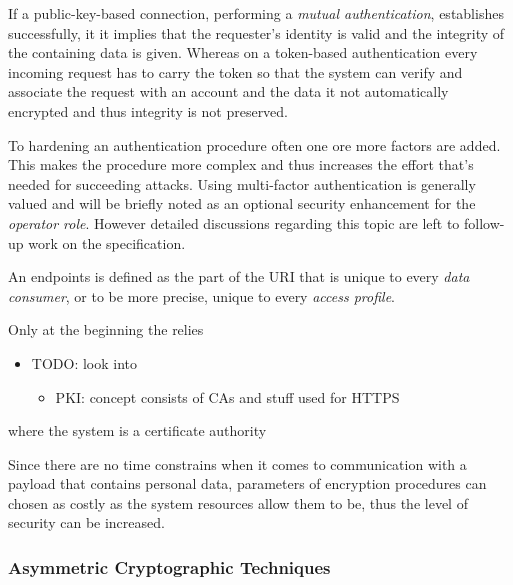 \documentclass[12pt,english,a4paper,titlepage,cleardoublepage=empty,dottedtoc]{report}
\providecommand{\tightlist}{%
  \setlength{\itemsep}{0pt}\setlength{\parskip}{0pt}}
\begin{document}
If a public-key-based connection, performing a \emph{mutual
authentication}, establishes successfully, it it implies that the
requester's identity is valid and the integrity of the containing data
is given. Whereas on a token-based authentication every incoming request
has to carry the token so that the system can verify and associate the
request with an account and the data it not automatically encrypted and
thus integrity is not preserved.

To hardening an authentication procedure often one ore more factors are
added. This makes the procedure more complex and thus increases the
effort that's needed for succeeding attacks. Using multi-factor
authentication is generally valued and will be briefly noted as an
optional security enhancement for the \emph{operator role}. However
detailed discussions regarding this topic are left to follow-up work on
the specification.

An endpoints is defined as the part of the URI that is unique to every
\emph{data consumer}, or to be more precise, unique to every
\emph{access profile}.

Only at the beginning the relies

\begin{itemize}
\tightlist
\item
  TODO: look into

  \begin{itemize}
  \tightlist
  \item
    PKI: concept consists of CAs and stuff used for HTTPS
  \end{itemize}
\end{itemize}

where the system is a certificate authority

Since there are no time constrains when it comes to communication with a
payload that contains personal data, parameters of encryption procedures
can chosen as costly as the system resources allow them to be, thus the
level of security can be increased.

\subsubsection{Asymmetric Cryptographic
Techniques}\label{asymmetric-cryptographic-techniques}
\end{document}

